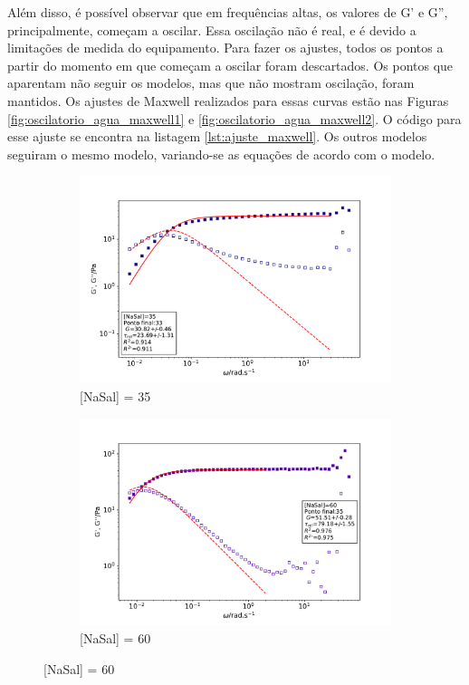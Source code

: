 		Além disso, é possível observar que em frequências altas, os valores de G' e G'', principalmente, começam a oscilar. Essa oscilação não é real, e é devido a limitações de medida do equipamento. Para fazer os ajustes, todos os pontos a partir do momento em que começam a oscilar foram descartados. Os pontos que aparentam não seguir os modelos, mas que não mostram oscilação, foram mantidos. Os ajustes de Maxwell realizados para essas curvas estão nas Figuras \ref{fig:oscilatorio_agua_maxwell1} e \ref{fig:oscilatorio_agua_maxwell2}. O código para esse ajuste se encontra na listagem \ref{lst:ajuste_maxwell}. Os outros modelos seguiram o mesmo modelo, variando-se as equações de acordo com o modelo.
				
		\begin{figure}[h]
			\begin{subfigure}[t]{0.5\textwidth}
				\includegraphics[width=\textwidth]{imagens/reologia/oscilatorio_agua_35}
				\caption{[NaSal] = 35\mM}
				\label{fig:oscilatorio_agua_35}
			\end{subfigure} %
			\begin{subfigure}[t]{0.5\textwidth}
				\centering
				\includegraphics[width=\textwidth]{imagens/reologia/oscilatorio_agua_60}
				\caption{[NaSal] = 60\mM}
				\label{fig:oscilatorio_agua_60}
			\end{subfigure}
			

\end{figure}
